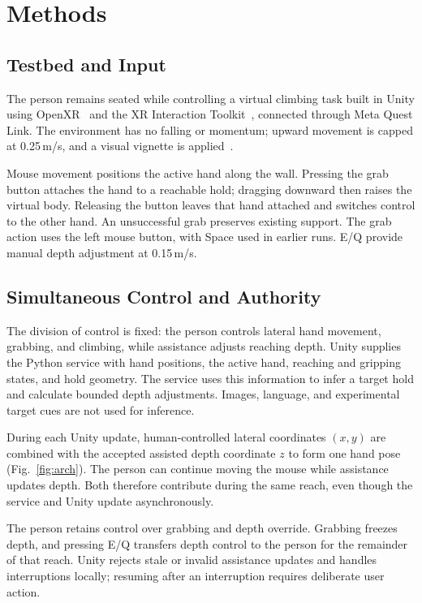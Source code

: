 \section{Methods}

\subsection{Testbed and Input}
The person remains seated while controlling a virtual climbing task built
in Unity using OpenXR~\cite{openxr} and the XR Interaction
Toolkit~\cite{unity-xri}, connected through Meta Quest Link. The environment
has no falling or momentum; upward movement is capped at 0.25\,m/s, and a
visual vignette is applied~\cite{fernandes2016combating}.

Mouse movement positions the active hand along the wall. Pressing the grab
button attaches the hand to a reachable hold; dragging downward then raises
the virtual body. Releasing the button leaves that hand attached and switches
control to the other hand. An unsuccessful grab preserves existing support.
The grab action uses the left mouse button, with Space used in earlier runs.
E/Q provide manual depth adjustment at 0.15\,m/s.

\subsection{Simultaneous Control and Authority}
The division of control is fixed: the person controls lateral hand movement,
grabbing, and climbing, while assistance adjusts reaching depth. Unity supplies
the Python service with hand positions, the active hand, reaching and gripping
states, and hold geometry. The service uses this information to infer a target
hold and calculate bounded depth adjustments. Images, language, and experimental
target cues are not used for inference.

During each Unity update, human-controlled lateral coordinates $(x,y)$ are
combined with the accepted assisted depth coordinate $z$ to form one hand pose
(Fig.~\ref{fig:arch}). The person can continue moving the mouse while assistance
updates depth. Both therefore contribute during the same reach, even though
the service and Unity update asynchronously.

The person retains control over grabbing and depth override. Grabbing freezes
depth, and pressing E/Q transfers depth control to the person for the remainder
of that reach. Unity rejects stale or invalid assistance updates and handles
interruptions locally; resuming after an interruption requires deliberate
user action.

